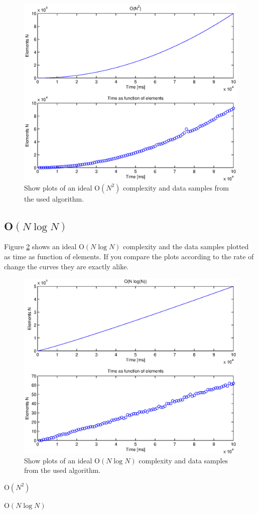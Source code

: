 \begin{figure}[th!]
\centering
\includegraphics[width=1\textwidth]{./graphics/test1.eps}
\caption{Show plots of an ideal O\(\left( { N }^{ 2 } \right)\) complexity and data samples from the used algorithm.}

\label{fig:test1}
\end{figure}
\newpage


\subsection{O\(\left( N\log {N }  \right) \)}
Figure \ref{fig:test2} shows an ideal O\(\left( N\log {N }  \right) \) complexity and the data samples plotted as time as function of elements. If you compare the plots according to the rate of change the curves they are exactly alike. 



\begin{figure}[th!]
\centering
\includegraphics[width=1\textwidth]{./graphics/test2.eps}
\caption{Show plots of an ideal O\(\left( N\log {N }  \right) \) complexity and data samples from the used algorithm.}
\label{fig:test2}
\end{figure}



O\(\left( { N }^{ 2 } \right)\)

O\(\left( N\log {N }  \right) \)